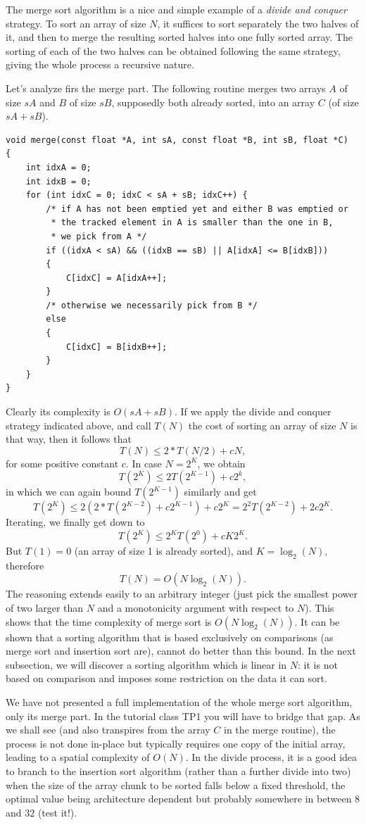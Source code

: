 \documentclass[12pt]{article}
\theoremstyle{plain}
\theoremstyle{remark}
\begin{document}
The merge sort algorithm is a nice and simple example of a {\it divide and
conquer} strategy. To sort an array of size $N$, it suffices to sort separately
the two halves of it, and then to merge the resulting sorted halves into one
fully sorted array. The sorting of each of the two halves can be obtained 
following the same strategy, giving the whole process a recursive nature.

Let's analyze firs the merge part. The following routine merges two arrays $A$
of size $sA$ and $B$ of size $sB$, supposedly both already sorted, into an array
$C$ (of size $sA + sB$).

\begin{lstlisting}[style=C]
void merge(const float *A, int sA, const float *B, int sB, float *C)
{
	int idxA = 0;
	int idxB = 0;
	for (int idxC = 0; idxC < sA + sB; idxC++) {
		/* if A has not been emptied yet and either B was emptied or
		 * the tracked element in A is smaller than the one in B, 
		 * we pick from A */
		if ((idxA < sA) && ((idxB == sB) || A[idxA] <= B[idxB])) 
		{
			C[idxC] = A[idxA++];
		} 
		/* otherwise we necessarily pick from B */
		else 
		{
			C[idxC] = B[idxB++];
		}
	}
}
\end{lstlisting}

Clearly its complexity is $O(sA + sB)$. If we apply the divide and conquer
strategy indicated above, and call $T(N)$ the cost of sorting an array of 
size $N$ is that way, then it follows that 
$$
T(N) \leq 2 * T(N/2) + cN, 
$$
for some positive constant $c$. In case $N = 2^K$, we obtain
$$
T(2^K) \leq 2T(2^{K-1}) + c2^k,
$$
in which we can again bound $T(2^{K-1})$ similarly and get
$$
T(2^{K}) \leq 2\left( 2*T(2^{K - 2}) + c2^{K-1}\right) + c2^K = 2^2T(2^{K-2}) +
2c2^K.
$$
Iterating, we finally get down to
$$
T(2^K) \leq 2^KT(2^0) + cK2^K.
$$
But $T(1) = 0$ (an array of size 1 is already sorted), and $K = \log_2(N)$, therefore
$$
T(N) = O(N\log_2(N)).
$$
The reasoning extends easily to an arbitrary integer (just pick the smallest
power of two larger than $N$ and a monotonicity argument with respect to $N$).
This shows that the time complexity of merge sort is $O(N\log_2(N)).$ It can be
shown that a sorting algorithm that is based exclusively on comparisons (as
merge sort and insertion sort are), cannot do better than this bound. In the
next subsection, we will discover a sorting algorithm which is linear in $N$: it
is not based on comparison and imposes some restriction on the data it can sort.

We have not presented a full implementation of the whole merge sort algorithm,
only its merge part. In the tutorial class TP1 you will have to bridge that
gap. As we shall see (and also transpires from the array $C$ in the merge
routine), the process is not done in-place but typically requires one copy
of the initial array, leading to a spatial complexity of $O(N).$
In the divide process, it is a good idea to branch to the insertion sort
algorithm (rather than a further divide into two) when the size of the
array chunk to be sorted falls below a fixed threshold, the optimal value
being architecture dependent but probably somewhere in between $8$ and $32$
(test it!).
\end{document}
